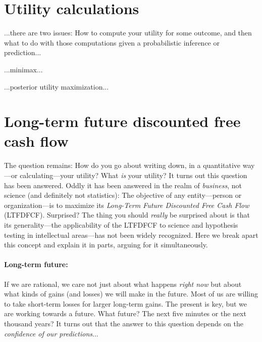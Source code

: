 \documentclass[12pt,twoside,pdftex]{article}
\begin{document}
\section{Utility calculations}

...there are two issues: How to compute your utility for some outcome,
and then what to do with those computations given a probabilistic
inference or prediction...

...minimax...

...posterior utility maximization...

\section{Long-term future discounted free cash flow}

The question remains: How do you go about writing down, in a
quantitative way---or calculating---your utility?  What \emph{is} your
utility?  It turns out this question has been answered.  Oddly it has
been answered in the realm of \emph{business},
not science (and definitely not statistics): The objective of any
entity---person or organization---is to maximize its \emph{Long-Term
Future Discounted Free Cash Flow} (LTFDFCF).  Surprised?  The thing
you should \emph{really} be surprised about is that its
generality---the applicability of the LTFDFCF to science and
hypothesis testing in intellectual areas---has not been widely
recognized.  Here we break apart this concept and explain it in parts,
arguing for it simultaneously.

\paragraph{Long-term future:}
If we are rational, we care not just about what happens \emph{right
now} but about what kinds of gains (and losses) we will make in the
future.  Most of us are willing to take short-term losses for larger
long-term gains.  The present is key, but we are working towards a
future.  What future?  The next five minutes or the next thousand
years?  It turns out that the answer to this question depends on the
\emph{confidence of our predictions}...
\end{document}
